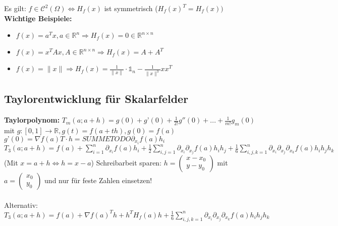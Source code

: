 \documentclass[german]{latex4ei/latex4ei_sheet}
\begin{document}
	Es gilt: $f \in \mathcal{C}^2(\Omega) \Leftrightarrow H_f(x)$ ist symmetrisch ($H_f(x)^T = H_f(x))$\\
\textbf{Wichtige Beispiele:}\\
\begin{itemize}

\item $f(x)=a^T x, a \in \mathbb{R}^n \Rightarrow H_f (x) = 0 \in \mathbb{R}^{n \times n}$ \item $f(x)=x^T A x, A \in \mathbb{R}^{n \times n} \Rightarrow H_f (x) = A + A^T$
\item $f(x)=\|x\| \Rightarrow H_f (x) = \frac{1}{\|x\|} \cdot \mathbb{1}_n - \frac{1}{\|x\|^3} x x^T$

\end{itemize}

\subsection{Taylorentwicklung f\"ur Skalarfelder}
\textbf{Taylorpolynom:} $T_m (a ; a+h) = g(0) + g’(0) + \frac{1}{2!} g''(0) + ... + \frac{1}{m!} g_m(0)$ mit $g: [0,1] \rightarrow \mathbb{R}, g(t)=f(a+t h), g(0)=f(a)$ \\ $g’(0)=\nabla f(a)T \cdot h = SUMME TODO \partial_{x_i}f(a) h_i$\\
$T_3(a ; a+h)=f(a)+ \sum_{i=1}^{n} \partial_{x_i} f(a) h_i + \frac{1}{2} \sum_{i,j=1}^{n} \partial_{x_i} \partial_{x_j} f(a) h_i h_j + \frac{1}{6} \sum_{i,j,k=1}^{n} \partial_{x_i} \partial_{x_j} \partial_{x_k} f(a) h_i h_j h_k$ (Mit $x=a+h \Leftrightarrow h=x-a$) Schreibarbeit sparen: $h=\begin{pmatrix} x-x_0 \\ y-y_0\end{pmatrix}$ mit $a=\begin{pmatrix}x_0 \\ y_0\end{pmatrix}$ und nur f\"ur feste Zahlen einsetzen!\\\\
Alternativ: $T_3(a ; a+h)=f(a)+ \nabla f(a)^T h + h^T H_f(a) h + \frac{1}{6} \sum_{i,j,k=1}^{n} \partial_{x_i} \partial_{x_j} \partial_{x_k} f(a) h_i h_j h_k$
\end{document}
